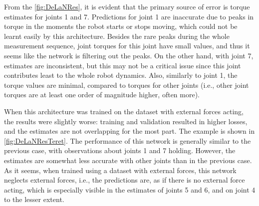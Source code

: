 
From the \cref{fig:DeLaNRes}, it is evident that the primary source of error is torque estimates for joints 1 and 7. Predictions for joint 1 are inaccurate due to peaks in torque in the moments the robot starts or stops moving, which could not be learnt easily by this architecture. Besides the rare peaks during the whole measurement sequence, joint torques for this joint have small values, and thus it seems like the network is filtering out the peaks. On the other hand, with joint 7, estimates are inconsistent, but this may not be a critical issue since this joint contributes least to the whole robot dynamics. Also, similarly to joint 1, the torque values are minimal, compared to torques for other joints (i.e., other joint torques are at least one order of magnitude higher, often more).

When this architecture was trained on the dataset with external forces acting, the results were slightly worse: training and validation resulted in higher losses, and the estimates are not overlapping for the most part. The example is shown in \cref{fig:DeLaNResTeret}. The performance of this network is generally similar to the previous case, with observations about joints 1 and 7 holding. However, the estimates are somewhat less accurate with other joints than in the previous case. As it seems, when trained using a dataset with external forces, this network neglects external forces, i.e., the predictions are, as if there is no external force acting, which is especially visible in the estimates of joints 5 and 6, and on joint 4 to the lesser extent.

